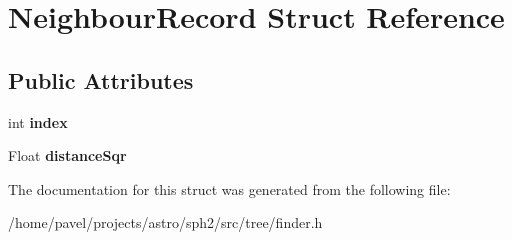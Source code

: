\hypertarget{structNeighbourRecord}{}\section{Neighbour\+Record Struct Reference}
\label{structNeighbourRecord}
\subsection*{Public Attributes}
\begin{DoxyCompactItemize}
\item 
\hypertarget{structNeighbourRecord_a156deb791fa1777f25497c491add4deb}{}\label{structNeighbourRecord_a156deb791fa1777f25497c491add4deb} 
int {\bfseries index}
\item 
\hypertarget{structNeighbourRecord_a95b76094dd1b5f9c2a76fcbf7cc55d83}{}\label{structNeighbourRecord_a95b76094dd1b5f9c2a76fcbf7cc55d83} 
Float {\bfseries distance\+Sqr}
\end{DoxyCompactItemize}


The documentation for this struct was generated from the following file\+:\begin{DoxyCompactItemize}
\item 
/home/pavel/projects/astro/sph2/src/tree/finder.\+h\end{DoxyCompactItemize}
